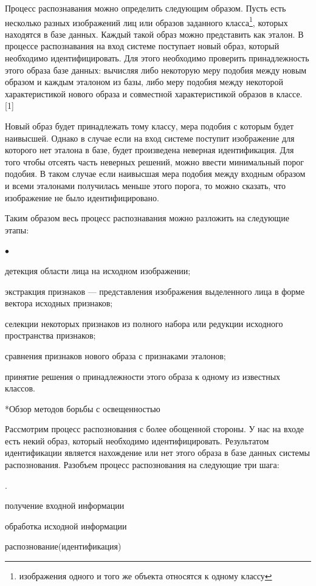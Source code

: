 \documentclass[a4paper,12pt,titlpage]{posobie}
\makeatletter
\newcommand{\MarkDot}{{$\bullet$}} %
\newenvironment{dotlist}%
    {\begin{list}{\MarkDot}{\partopsep=0mm\itemsep=0mm\topsep=0mm\parsep=0mm\partopsep=0mm\parskip=0mm}}%
    {\end{list}}
\newenvironment{enum}%
{\begin{list}{\arabic{enumi}.~}{\usecounter{enumi}\partopsep=0mm\itemsep=0mm\topsep=0mm\parsep=0mm\partopsep=0mm\parskip=0mm}}%
   {\end{list}}
\renewcommand{\section}{\@startsection{section}{1}{0.0cm}{0.5cm}{0.1cm}%
             {\fontsize{16}{16}\bf\selectfont }}
\makeatother
\begin{document}
    Процесс распознавания можно определить следующим образом. Пусть есть несколько разных изображений лиц 
или образов заданного класса\footnote{изображения одного и того же объекта относятся к одному классу}, которых находятся в базе 
данных. Каждый такой образ можно представить как эталон. В процессе распознавания на вход системе поступает новый образ, 
который необходимо идентифицировать. Для этого необходимо проверить принадлежность этого образа базе данных: вычисляя
либо некоторую меру подобия между новым образом и каждым эталоном из базы, либо меру подобия между некоторой характеристикой
нового образа и совместной характеристикой образов в классе.[1]

     Новый образ будет принадлежать тому классу, мера подобия с которым будет наивысшей. Однако в случае если на вход системе
поступит изображение для которого нет эталона в базе, будет произведена неверная идентификация. Для того чтобы отсеять часть неверных 
решений, можно ввести минимальный порог подобия. В таком случае если наивысшая мера подобия между входным образом и всеми эталонами
получилась меньше этого порога, то можно сказать, что изображение не было идентифицировано. 

Таким образом весь процесс распознавания можно разложить на следующие этапы:
\begin{dotlist}
\item детекция области лица на исходном изображении;
\item экстракция признаков --- представления изображения выделенного лица в форме вектора исходных признаков;
\item селекции некоторых признаков из полного набора или редукции исходного пространства признаков;
\item сравнения признаков нового образа с признаками эталонов;
\item принятие решения о принадлежности этого образа к одному из известных классов.
\end{dotlist}

\section*{Обзор методов борьбы с освещенностью}
     Рассмотрим процесс распознования с более обощенной стороны. У нас на входе есть некий образ, который необходимо идентифицировать.
Результатом идентификации является нахождение или нет этого образа в базе данных системы распознования. Разобъем процесс распознования на 
следующие три шага:
\begin{enum}
\item получение входной информации
\item обработка исходной информации 
\item распознование(идентификация)
\end{enum}
\end{document}
